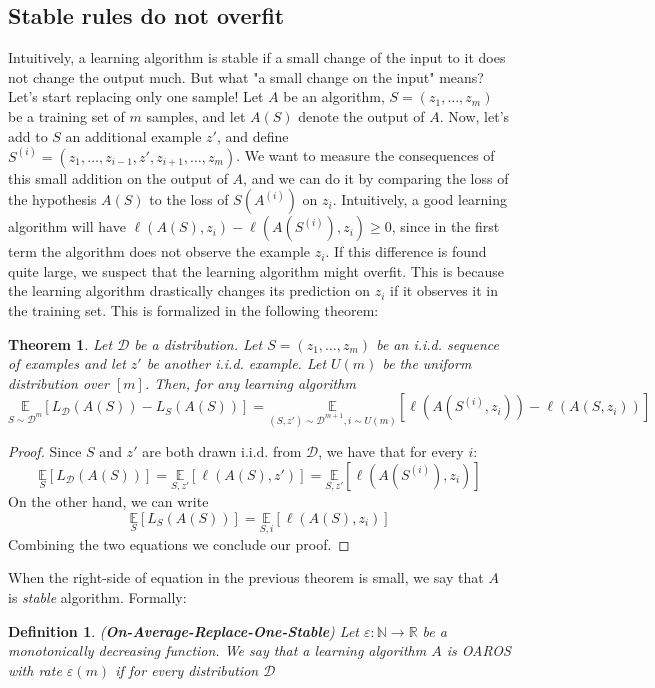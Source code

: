 \documentclass[12pt]{report}
\theoremstyle{plain}
\newtheorem{theorem}{Theorem}[chapter]
\newtheorem{definition}{Definition}[chapter]
\newcommand\mcl[1]{\mathcal{#1}}
\begin{document}
\begin{flushleft}
\section{Stable rules do not overfit}
Intuitively, a learning algorithm is stable if a small change of the input to it does not change the output much. But what "a small change on the input" means?\\
Let's start replacing only one sample! Let $A$ be an algorithm, $S=(z_1,\dots,z_m)$ be a training set of $m$ samples, and let $A(S)$ denote the output of $A$. Now, let's add to $S$ an additional example $z'$, and define $S^{(i)}=(z_1,\dots,z_{i-1},z',z_{i+1},\dots,z_m)$. We want to measure the consequences of this small addition on the output of $A$, and we can do it by comparing the loss of the hypothesis $A(S)$ to the loss of $S(A^{(i)})$ on $z_i$. Intuitively, a good learning algorithm will have $\ell(A(S),z_i)-\ell(A(S^{(i)}),z_i)\geq 0$, since in the first term the algorithm does not observe the example $z_i$. If this difference is found quite large, we suspect that the learning algorithm might overfit. This is because the learning algorithm drastically changes its prediction on $z_i$ if it observes it in the training set. This is formalized in the following theorem:
\begin{theorem}
	Let $\mcl{D}$ be a distribution. Let $S=(z_1,\dots,z_m)$ be an i.i.d. sequence of examples and let $z'$ be another i.i.d. example. Let $U(m)$ be the uniform distribution over $[m]$. Then, for any learning algorithm
	\[ \underset{S\sim\mcl{D}^m}{\mathds{E}}\left[L_\mcl{D}(A(S))-L_S(A(S))\right] = \underset{(S,z')\sim\mcl{D}^{m+1},i\sim U(m)}{\mathds{E}}\left[\ell(A(S^{(i)},z_i))-\ell(A(S,z_i))\right] \]
\end{theorem}
\begin{proof}
	Since $S$ and $z'$ are both drawn i.i.d. from $\mcl{D}$, we have that for every $i$:
	\[ \underset{S}{\mathds{E}}\left[L_\mcl{D}(A(S))\right] =  \underset{S,z'}{\mathds{E}}\left[\ell(A(S),z')\right] = \underset{S,z'}{\mathds{E}}\left[\ell(A(S^{(i)}),z_i)\right] \]
	On the other hand, we can write 
	\[ \underset{S}{\mathds{E}}\left[L_S(A(S))\right] = \underset{S,i}{\mathds{E}}\left[\ell(A(S),z_i)\right] \]
	Combining the two equations we conclude our proof.
\end{proof}
When the right-side of equation in the previous theorem is small, we say that $A$ is \textit{stable} algorithm. Formally:
\begin{definition} (\textbf{On-Average-Replace-One-Stable})
	Let $\varepsilon:\mathds{N}\to\mathds{R}$ be a monotonically decreasing function. We say that a learning algorithm $A$ is \textit{OAROS} with rate $\varepsilon(m)$ if for every distribution $\mcl{D}$ 

\end{definition}
\end{flushleft}
\end{document}
